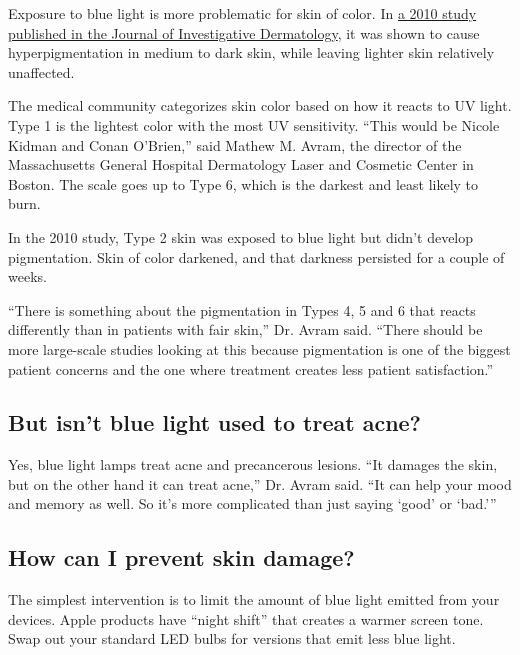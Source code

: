 Exposure to blue light is more problematic for skin of color. In
\href{https://www.sciencedirect.com/science/article/pii/S0022202X15349307}{a
2010 study published in the Journal of Investigative Dermatology}, it
was shown to cause hyperpigmentation in medium to dark skin, while
leaving lighter skin relatively unaffected.

The medical community categorizes skin color based on how it reacts to
UV light. Type 1 is the lightest color with the most UV sensitivity.
``This would be Nicole Kidman and Conan O'Brien,'' said Mathew M. Avram,
the director of the Massachusetts General Hospital Dermatology Laser and
Cosmetic Center in Boston. The scale goes up to Type 6, which is the
darkest and least likely to burn.

In the 2010 study, Type 2 skin was exposed to blue light but didn't
develop pigmentation. Skin of color darkened, and that darkness
persisted for a couple of weeks.

``There is something about the pigmentation in Types 4, 5 and 6 that
reacts differently than in patients with fair skin,'' Dr. Avram said.
``There should be more large-scale studies looking at this because
pigmentation is one of the biggest patient concerns and the one where
treatment creates less patient satisfaction.''

\hypertarget{but-isnt-blue-light-used-to-treat-acne}{%
\subsection{But isn't blue light used to treat
acne?}\label{but-isnt-blue-light-used-to-treat-acne}}

Yes, blue light lamps treat acne and precancerous lesions. ``It damages
the skin, but on the other hand it can treat acne,'' Dr. Avram said.
``It can help your mood and memory as well. So it's more complicated
than just saying `good' or `bad.'''

\hypertarget{how-can-i-prevent-skin-damage}{%
\subsection{How can I prevent skin
damage?}\label{how-can-i-prevent-skin-damage}}

The simplest intervention is to limit the amount of blue light emitted
from your devices. Apple products have ``night shift'' that creates a
warmer screen tone. Swap out your standard LED bulbs for versions that
emit less blue light.

